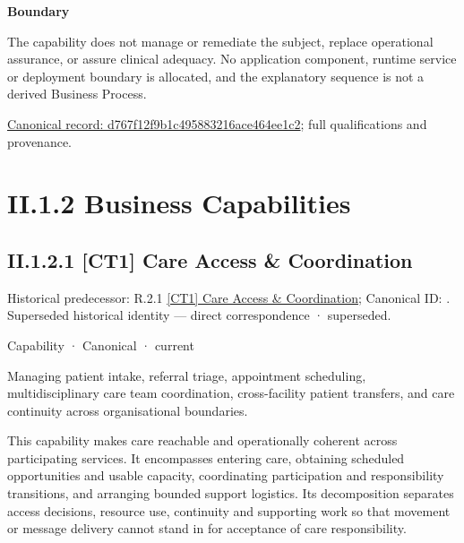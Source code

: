 \textbf{Boundary}



The capability does not manage or remediate the subject, replace operational assurance, or assure clinical adequacy. No application component, runtime service or deployment boundary is allocated, and the explanatory sequence is not a derived Business Process.


{\footnotesize \href{../../../../../../../continuum/strategy/capability/d767f12f9b1c495883216ace464ee1c2.md}{Canonical record: d767f12f9b1c495883216ace464ee1c2}; full qualifications and provenance.}\par
\section*{II.1.2 Business Capabilities}
\label{navigation:II.1.2}

\subsection*{II.1.2.1 [CT1] Care Access \& Coordination}
\label{navigation:II.1.2.1}

{\small Historical predecessor: R.2.1 \hyperref[element:0dec07b6ddbe48bda93a2295dd3e2d7d]{[CT1] Care Access \& Coordination}; Canonical ID: \texttt{}. Superseded historical identity — direct correspondence · superseded.}\par
\label{element:ed342cb8656b4f80b55ad519ecbd2d3a}
{\small Capability · Canonical · current}\par

Managing patient intake, referral triage, appointment scheduling, multidisciplinary care team coordination, cross-facility patient transfers, and care continuity across organisational boundaries.



This capability makes care reachable and operationally coherent across participating services. It encompasses entering care, obtaining scheduled opportunities and usable capacity, coordinating participation and responsibility transitions, and arranging bounded support logistics. Its decomposition separates access decisions, resource use, continuity and supporting work so that movement or message delivery cannot stand in for acceptance of care responsibility.



